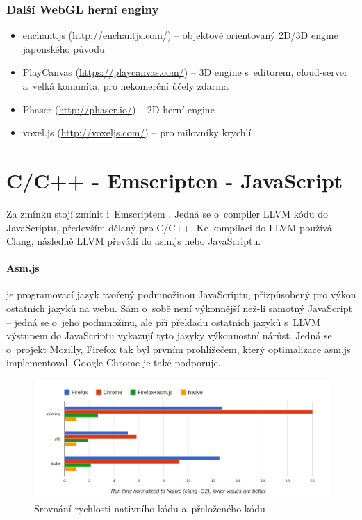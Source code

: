 \documentclass[12pt,a4paper,titlepage,final]{report}
\begin{document}
\subsubsection{Další WebGL herní enginy}
\begin{itemize}
	\item enchant.js (\url{http://enchantjs.com/}) -- objektově orientovaný 2D/3D engine japonského původu
	\item PlayCanvas (\url{https://playcanvas.com/}) -- 3D engine s~editorem, cloud-server a~velká komunita, pro nekomerční účely zdarma
	\item Phaser (\url{http://phaser.io/}) -- 2D herní engine
	\item voxel.js (\url{http://voxeljs.com/}) -- pro milovníky krychlí
\end{itemize}

\section{C/C++ - Emscripten - JavaScript}

Za zmínku stojí zmínit i~Emscriptem \cite{emscripten-pres}. Jedná se o~compiler LLVM kódu do JavaScriptu, především dělaný pro C/C++. Ke kompilaci do LLVM používá Clang, následně LLVM převádí do asm.js nebo JavaScriptu.

\paragraph{Asm.js} \cite{asmjs} je programovací jazyk tvořený podmnožinou JavaScriptu, přizpůsobený pro výkon ostatních jazyků na webu. Sám o~sobě není výkonnější než-li samotný JavaScript -- jedná se o~jeho podmnožinu, ale při překladu ostatních jazyků s~LLVM výstupem do JavaScriptu vykazují tyto jazyky výkonnostní nárůst. Jedná se o~projekt Mozilly, Firefox tak byl prvním prohlížečem, který optimalizace asm.js implementoval. Google Chrome je také podporuje.

\begin{figure}[ht]
\begin{center}
\includegraphics[width=14cm]{images/micro3b.png}
\caption{Srovnání rychlosti nativního kódu a~přeloženého kódu}
\label{fig:theory}
\end{center}
\end{figure}
\end{document}

